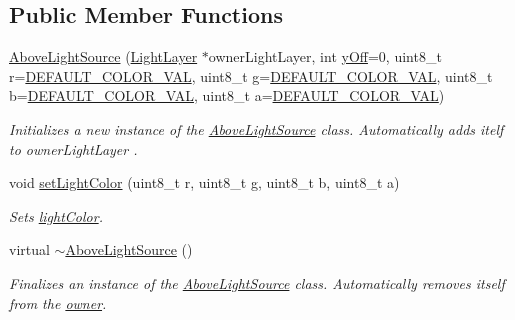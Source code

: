 \subsection*{Public Member Functions}
\begin{DoxyCompactItemize}
\item 
\hyperlink{classlighting_1_1AboveLightSource_a0d155c74d7ce68008a17bff184d72db5}{Above\+Light\+Source} (\hyperlink{classlighting_1_1LightLayer}{Light\+Layer} $\ast$owner\+Light\+Layer, int \hyperlink{classlighting_1_1AboveLightSource_a558b3b3a03cdabc36a6ae73cbd41083d}{y\+Off}=0, uint8\+\_\+t r=\hyperlink{classlighting_1_1AboveLightSource_aa3134b6aa1f08719f50290094f014eb2}{D\+E\+F\+A\+U\+L\+T\+\_\+\+C\+O\+L\+O\+R\+\_\+\+V\+AL}, uint8\+\_\+t g=\hyperlink{classlighting_1_1AboveLightSource_aa3134b6aa1f08719f50290094f014eb2}{D\+E\+F\+A\+U\+L\+T\+\_\+\+C\+O\+L\+O\+R\+\_\+\+V\+AL}, uint8\+\_\+t b=\hyperlink{classlighting_1_1AboveLightSource_aa3134b6aa1f08719f50290094f014eb2}{D\+E\+F\+A\+U\+L\+T\+\_\+\+C\+O\+L\+O\+R\+\_\+\+V\+AL}, uint8\+\_\+t a=\hyperlink{classlighting_1_1AboveLightSource_aa3134b6aa1f08719f50290094f014eb2}{D\+E\+F\+A\+U\+L\+T\+\_\+\+C\+O\+L\+O\+R\+\_\+\+V\+AL})
\begin{DoxyCompactList}\small\item\em Initializes a new instance of the \hyperlink{classlighting_1_1AboveLightSource}{Above\+Light\+Source} class. Automatically adds itelf to {\itshape owner\+Light\+Layer} . \end{DoxyCompactList}\item 
void \hyperlink{classlighting_1_1AboveLightSource_a5a1e95ad0bc1ae4c4538f2899f46b37d}{set\+Light\+Color} (uint8\+\_\+t r, uint8\+\_\+t g, uint8\+\_\+t b, uint8\+\_\+t a)
\begin{DoxyCompactList}\small\item\em Sets \hyperlink{classlighting_1_1AboveLightSource_a67835e37619d5d86023ef1fbc315546b}{light\+Color}. \end{DoxyCompactList}\item 
virtual \hyperlink{classlighting_1_1AboveLightSource_a5f7e204332d81a44fbb2a89df03acfbd}{$\sim$\+Above\+Light\+Source} ()
\begin{DoxyCompactList}\small\item\em Finalizes an instance of the \hyperlink{classlighting_1_1AboveLightSource}{Above\+Light\+Source} class. Automatically removes itself from the \hyperlink{classlighting_1_1LightSource_ab991aac9d9ab3a1583f4acdc209055d5}{owner}. \end{DoxyCompactList}\end{DoxyCompactItemize}
